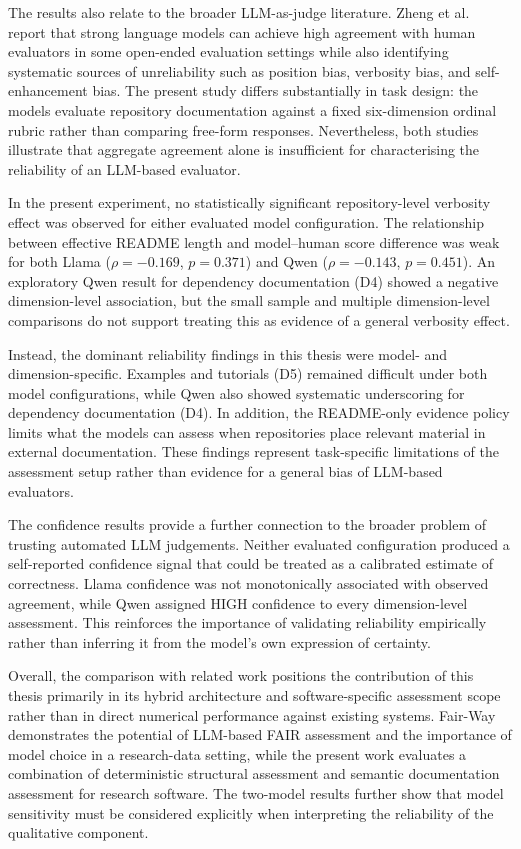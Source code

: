 The results also relate to the broader LLM-as-judge literature.
Zheng et al.\ \cite{zheng2023llmjudge} report that strong language
models can achieve high agreement with human evaluators in some
open-ended evaluation settings while also identifying systematic
sources of unreliability such as position bias, verbosity bias, and
self-enhancement bias. The present study differs substantially in
task design: the models evaluate repository documentation against a
fixed six-dimension ordinal rubric rather than comparing free-form
responses. Nevertheless, both studies illustrate that aggregate
agreement alone is insufficient for characterising the reliability
of an LLM-based evaluator.

In the present experiment, no statistically significant
repository-level verbosity effect was observed for either evaluated
model configuration. The relationship between effective README length
and model--human score difference was weak for both Llama
($\rho=-0.169$, $p=0.371$) and Qwen
($\rho=-0.143$, $p=0.451$). An exploratory Qwen result for dependency
documentation (D4) showed a negative dimension-level association, but
the small sample and multiple dimension-level comparisons do not
support treating this as evidence of a general verbosity effect.

Instead, the dominant reliability findings in this thesis were
model- and dimension-specific. Examples and tutorials (D5) remained
difficult under both model configurations, while Qwen also showed
systematic underscoring for dependency documentation (D4). In
addition, the README-only evidence policy limits what the models can
assess when repositories place relevant material in external
documentation. These findings represent task-specific limitations of
the assessment setup rather than evidence for a general bias of
LLM-based evaluators.

The confidence results provide a further connection to the broader
problem of trusting automated LLM judgements. Neither evaluated
configuration produced a self-reported confidence signal that could
be treated as a calibrated estimate of correctness. Llama confidence
was not monotonically associated with observed agreement, while Qwen
assigned HIGH confidence to every dimension-level assessment. This
reinforces the importance of validating reliability empirically rather
than inferring it from the model's own expression of certainty.

Overall, the comparison with related work positions the contribution
of this thesis primarily in its hybrid architecture and
software-specific assessment scope rather than in direct numerical
performance against existing systems. Fair-Way demonstrates the
potential of LLM-based FAIR assessment and the importance of model
choice in a research-data setting, while the present work evaluates
a combination of deterministic structural assessment and semantic
documentation assessment for research software. The two-model results
further show that model sensitivity must be considered explicitly
when interpreting the reliability of the qualitative component.

